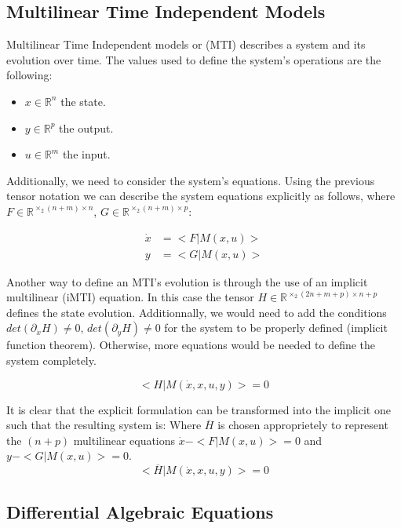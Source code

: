 \documentclass{article}
\begin{document}
\subsection{Multilinear Time Independent Models}

Multilinear Time Independent models or (MTI) describes a system and its evolution over time. 
The values used to define the system's operations are the following:

\begin{itemize}
    \item $x \in\mathbb{R}^n$ the state.   
    \item $y \in\mathbb{R}^p$ the output.   
    \item $u \in\mathbb{R}^m$ the input.   
\end{itemize}

Additionally, we need to consider the system's equations. 
Using the previous tensor notation we can describe the system equations explicitly as follows,
where $F \in \mathbb{R}^{\times_2 (n+m) \times n}$, $G \in \mathbb{R}^{\times_2 (n+m) \times p}$:

\begin{align}
    \dot{x} &= <F|M(x,u)>\\
    y &= <G|M(x,u)>
\end{align}

Another way to define an MTI's evolution is through the use of an implicit multilinear (iMTI) equation.
In this case the tensor $H \in \mathbb{R}^{\times_2 (2n+m+p) \times n+p}$ defines the state evolution. 
Additionnally, we would need to add the conditions $det(\partial_{\dot{x}} H) \neq 0$, $det(\partial_y H) \neq 0$ 
for the system to be properly defined (implicit function theorem). Otherwise, more equations would be needed to 
define the system completely.

\begin{equation}
    <H| M(\dot{x}, x, u, y)> = 0
\end{equation}

It is clear that the explicit formulation can be transformed into the implicit one such that the resulting system is:
Where $\overline{H}$ is chosen approprietely to represent the $(n+p)$ multilinear equations $\dot{x} - <F|M(x,u)> = 0$
and $y - <G|M(x,u)> = 0$.
\begin{equation}
    <\overline{H}| M(\dot{x}, x, u, y)> = 0
\end{equation}

\subsection{Differential Algebraic Equations}
\end{document}
